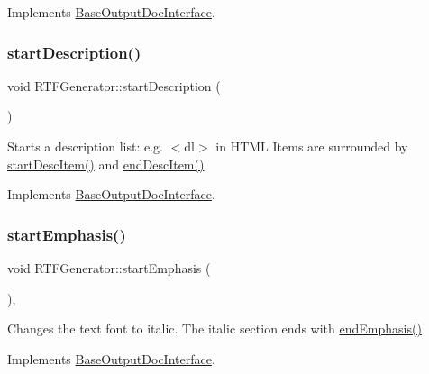 Implements \mbox{\hyperlink{class_base_output_doc_interface_a5d1cc59d94c3f529c90e0a06704be181}{Base\+Output\+Doc\+Interface}}.

\mbox{\label{class_r_t_f_generator_a9c6c7896f2bd09fb5e6ce53b9e6cee5c}} 
\subsubsection{\texorpdfstring{startDescription()}{startDescription()}}
{\footnotesize\ttfamily void R\+T\+F\+Generator\+::start\+Description (\begin{DoxyParamCaption}{ }\end{DoxyParamCaption})\hspace{0.3cm}{\ttfamily [virtual]}}

Starts a description list\+: e.\+g. {\ttfamily $<$dl$>$} in H\+T\+ML Items are surrounded by \mbox{\hyperlink{class_r_t_f_generator_a39ef721382a2a25ef0a41463a34f1b02}{start\+Desc\+Item()}} and \mbox{\hyperlink{class_r_t_f_generator_aaeb8cbfab437b4198548c4f06dc12847}{end\+Desc\+Item()}} 

Implements \mbox{\hyperlink{class_base_output_doc_interface_ac9c801c3ad0b50e3e69be184b50c2fef}{Base\+Output\+Doc\+Interface}}.

\mbox{\label{class_r_t_f_generator_a235071d9e43bed7dabaec79e88bf43c7}} 
\subsubsection{\texorpdfstring{startEmphasis()}{startEmphasis()}}
{\footnotesize\ttfamily void R\+T\+F\+Generator\+::start\+Emphasis (\begin{DoxyParamCaption}{ }\end{DoxyParamCaption})\hspace{0.3cm}{\ttfamily [inline]}, {\ttfamily [virtual]}}

Changes the text font to italic. The italic section ends with \mbox{\hyperlink{class_r_t_f_generator_a283896a8d13cd017f4b765d82ba1e132}{end\+Emphasis()}} 

Implements \mbox{\hyperlink{class_base_output_doc_interface_a21debc3a6c4c58791a41e715dc78f4ab}{Base\+Output\+Doc\+Interface}}.

